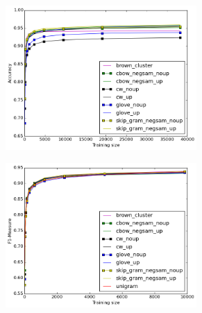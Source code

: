 \begin{figure}
\caption{Best results for each method for POS-Tagging and Chunking}
\centering
\begin{subfigure}{.5\textwidth}
	\centering
    \includegraphics[width=0.8\textwidth]{plots/bestPOS.png}    	
	\label{fig:bestpos}
\end{subfigure}%
\begin{subfigure}{.5\textwidth}
	\centering
    \includegraphics[width=0.8\textwidth]{plots/bestChunking.png}
	\label{fig:bestchunking}
\end{subfigure}
\end{figure}

